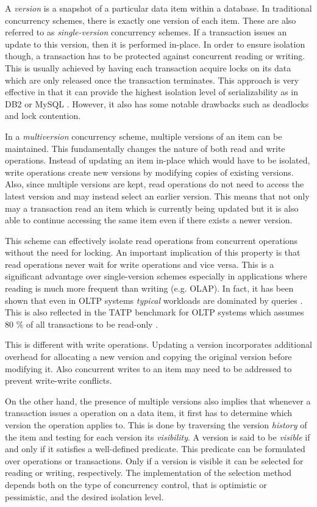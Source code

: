 A \emph{version} is a snapshot of a particular data item within a database. In
traditional concurrency schemes, there is exactly one version of each item.
These are also referred to as \emph{single-version} concurrency schemes. If a
transaction issues an update to this version, then it is performed in-place. In
order to ensure isolation though, a transaction has to be protected against
concurrent reading or writing. This is usually achieved by having each
transaction acquire locks on its data which are only released once the
transaction terminates. This approach is very effective in that it can provide
the highest isolation level of serializability as in DB2 or MySQL
\cite{berenson1995critique}. However, it also has some notable drawbacks such as
deadlocks and lock contention.

In a \emph{multiversion} concurrency scheme, multiple versions of an item can be
maintained. This fundamentally changes the nature of both read and write
operations. Instead of updating an item in-place which would have to be
isolated, write operations create new versions by modifying copies of existing
versions. Also, since multiple versions are kept, read operations do not need to
access the latest version and may instead select an earlier version. This means
that not only may a transaction read an item which is currently being updated
but it is also able to continue accessing the same item even if there exists a
newer version.

This scheme can effectively isolate read operations from concurrent operations
without the need for locking. An important implication of this property is that
read operations never wait for write operations and vice versa. This is a
significant advantage over single-version schemes especially in applications
where reading is much more frequent than writing (e.g. OLAP). In fact, it has
been shown that even in OLTP systems \emph{typical} workloads are dominated by
queries \cite{krueger2011fast, andrei2017sap}. This is also reflected in the
TATP benchmark for OLTP systems which assumes 80 \% of all transactions to be
read-only \cite{larson2011high, neumann2015fast, oukid2015instant}.

This is different with write operations. Updating a version incorporates
additional overhead for allocating a new version and copying the original
version before modifying it. Also concurrent writes to an item may need to be
addressed to prevent write-write conflicts.

On the other hand, the presence of multiple versions also implies that whenever
a transaction issues a operation on a data item, it first has to determine which
version the operation applies to. This is done by traversing the version
\emph{history} of the item and testing for each version its \emph{visibility}. A
version is said to be \emph{visible} if and only if it satisfies a well-defined
predicate. This predicate can be formulated over operations or transactions.
Only if a version is visible it can be selected for reading or writing,
respectively. The implementation of the selection method depends both on the
type of concurrency control, that is optimistic or pessimistic, and the desired
isolation level.

